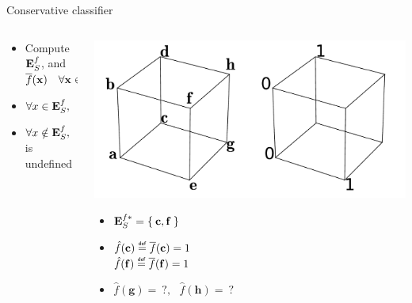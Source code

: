 \documentclass{beamer}
\begin{document}
\begin{frame}{Conservative classifier\cite{StrYvoREPORT05}}
  \begin{columns}
    \begin{column}{0.5\textwidth}
      \begin{itemize}
        \item Compute $\mathbf{E}_{S}^{f}$, and $\overline{f}(\mathbf{x}) ~~~ \forall \mathbf{x} \in \mathbf{E}_{S}^{f}$
        \item $\forall x \in\esf, ~~ \hat{f}(\mathbf{x}) \eqdef \albl{\mathbf{x}}$
        \item $\forall x \notin \mathbf{E}_{S}^{f}, ~~ \hat{f}(\mathbf{x})$ is undefined
      \end{itemize}
    \end{column}
    \begin{column}{0.5\textwidth}
      \begin{center}
        \includegraphics[width=.9\textwidth]{figures/ae_example.pdf}
      \end{center}
      \begin{itemize}
      \item $\mathbf{E}_{S}^{f*} = \Set{\mathbf{c}, \mathbf{f}}$
      \item $\hat{f}(\mathbf{c}) \eqdef \albl{\mathbf{c}} = 1$\\
        $\hat{f}(\mathbf{f}) \eqdef \albl{\mathbf{f}} = 1$
      \item $\hat{f}(\mathbf{g}) =~?, ~~~ \hat{f}(\mathbf{h}) =~?$
      \end{itemize}
    \end{column}
  \end{columns}
\end{frame}
\end{document}
